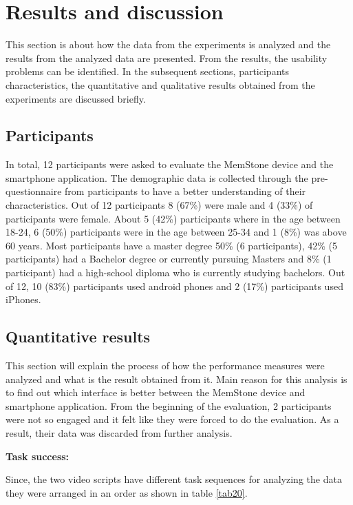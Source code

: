\documentclass[mscthesis]{usiinfthesis}
\begin{document}
\section{Results and discussion}
This section is about how the data from the experiments is analyzed and the results from the analyzed data are presented. From the results, the usability problems can be identified. In the subsequent sections, participants characteristics, the quantitative and qualitative results obtained from the experiments are discussed briefly.  

\subsection{Participants}
In total, 12 participants were asked to evaluate the MemStone device and the smartphone application. The demographic data is collected through the pre-questionnaire from participants to have a better understanding of their characteristics. Out of 12 participants 8 (67\%) were male and 4 (33\%) of participants were female. About 5 (42\%) participants where in the age between 18-24, 6 (50\%) participants were in the age between 25-34 and 1 (8\%) was above 60 years. Most participants have a master degree 50\% (6 participants), 42\% (5 participants) had a Bachelor degree or currently pursuing Masters and 8\% (1 participant) had a high-school diploma who is currently studying bachelors. Out of 12, 10 (83\%) participants used android phones and 2 (17\%) participants used iPhones. 

\subsection{Quantitative results}
This section will explain the process of how the performance measures were analyzed and what is the result obtained from it. Main reason for this analysis is to find out which interface is better between the MemStone device and smartphone application. From the beginning of the evaluation, 2 participants were not so engaged and it felt like they were forced to do the evaluation. As a result, their data was discarded from further analysis. 
\newline

\textbf{Task success:}

Since, the two video scripts have different task sequences for analyzing the data they were arranged in an order as shown in table \ref{tab20}. 
\end{document}
